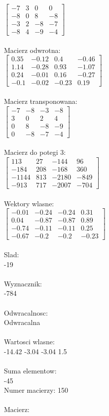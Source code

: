 \documentclass[a4paper,12pt]{article}
\begin{document}
$\begin{bmatrix} -7&3&0&0\\-8&0&8&-8\\-3&2&-8&-7\\-8&4&-9&-4 \end{bmatrix}$
\\
\\
Macierz odwrotna:\\

$\begin{bmatrix} 0.35&-0.12&0.4&-0.46\\1.14&-0.28&0.93&-1.07\\0.24&-0.01&0.16&-0.27\\-0.1&-0.02&-0.23&0.19 \end{bmatrix}$
\\
\\
Macierz transponowana:\\

$\begin{bmatrix} -7&-8&-3&-8\\3&0&2&4\\0&8&-8&-9\\0&-8&-7&-4 \end{bmatrix}$
\\
\\
Macierz do potegi 3:\\

$\begin{bmatrix} 113&27&-144&96\\-184&208&-168&360\\-1144&813&-2180&-849\\-913&717&-2007&-704 \end{bmatrix}$
\\
\\
Wektory wlasne:\\

$\begin{bmatrix} -0.01&-0.24&-0.24&0.31\\0.04&-0.87&-0.87&0.89\\-0.74&-0.11&-0.11&0.25\\-0.67&-0.2&-0.2&-0.23 \end{bmatrix}$
\\
\\
Slad:\\
-19
\\
\\
Wyznacznik:\\
-784
\\
\\
Odwracalnosc:\\
Odwracalna
\\
\\
Wartosci wlasne:\\
-14.42 -3.04 -3.04 1.5
\\
\\
Suma elementow:\\
-45
\\
\newpage
Numer macierzy:
150
\\
\\
Macierz:\\
\end{document}

